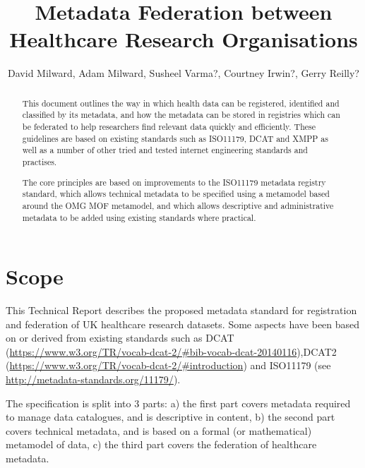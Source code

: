 \documentclass{article}
\begin{document}
	\pagestyle{headings}  %
	\title{Metadata Federation between Healthcare Research Organisations}
	
	\author{David Milward,  Adam Milward, Susheel Varma?, Courtney Irwin?, Gerry Reilly? }
	
	
	\maketitle
	
	\begin{abstract}
	This document outlines the way in which health data can be registered, identified and classified by its metadata, and how the metadata can be stored in registries which can be federated to help researchers find relevant data quickly and efficiently. These guidelines are based on existing standards such as ISO11179, DCAT and XMPP as well as a number of other tried and tested internet engineering standards and practises.
	
	The core principles are based on improvements to the ISO11179 metadata registry standard, which allows technical metadata to be specified using a metamodel based around the OMG MOF metamodel, and which allows descriptive and administrative metadata to be added using existing standards where practical.

	\end{abstract}
	
	\section{Scope}
	This Technical Report describes the proposed metadata standard for registration and federation of UK healthcare research datasets. Some aspects have been based on or derived from existing standards such as DCAT (\url{https://www.w3.org/TR/vocab-dcat-2/#bib-vocab-dcat-20140116}),DCAT2 (\url{https://www.w3.org/TR/vocab-dcat-2/#introduction}) and ISO11179 (see \url{http://metadata-standards.org/11179/}).
	
	The specification is split into 3 parts: a) the first part covers metadata required to manage data catalogues, and is descriptive in content, b) the second part covers technical metadata, and is based on a formal (or mathematical) metamodel of data, c) the third part covers the federation of healthcare metadata.
	
	
	
\end{document}
